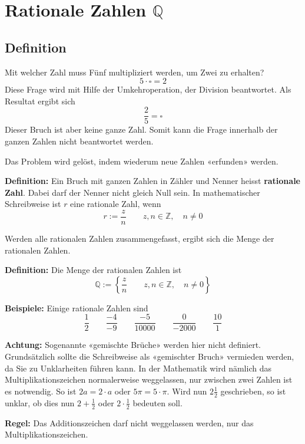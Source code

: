 \newpage
\section{Rationale Zahlen $\mathbb{Q}$}

\subsection{Definition}

Mit welcher Zahl muss Fünf multipliziert werden, um Zwei zu erhalten?
\[
  5\cdot\square = 2
\]
Diese Frage wird mit Hilfe der Umkehroperation, der Division beantwortet. Als Resultat ergibt sich
\[
  \frac{2}{5} = \square
\]
Dieser Bruch ist aber keine ganze Zahl. Somit kann die Frage innerhalb der ganzen Zahlen nicht beantwortet werden.

Das Problem wird gelöst, indem wiederum neue Zahlen «erfunden» werden.

\textbf{Definition:} Ein Bruch mit ganzen Zahlen in Zähler und Nenner heisst \textbf{rationale Zahl}. Dabei darf der Nenner nicht gleich Null sein. In mathematischer Schreibweise ist $r$ eine rationale Zahl, wenn
  \[
    r := \frac{z}{n} \qquad z,n \in \mathbb{Z},\quad n \ne 0
  \]

Werden alle rationalen Zahlen zusammengefasst, ergibt sich die Menge der rationalen Zahlen.

\textbf{Definition:} Die Menge der rationalen Zahlen ist
  \[
    \mathbb{Q} := \left\{ \frac{z}{n} \qquad z,n \in \mathbb{Z}, \quad n \ne 0\right\}
  \]
\begin{example}
  \textbf{Beispiele:} Einige rationale Zahlen sind
  \[
    \frac{1}{2} \qquad \frac{-4}{-9} \qquad \frac{-5}{10000} \qquad \frac{0}{-2000} \qquad \frac{10}{1}
  \]
\end{example}
\begin{note}
  \textbf{Achtung:} Sogenannte «gemischte Brüche» werden hier nicht definiert. Grundsätzlich sollte die Schreibweise als «gemischter Bruch» vermieden werden, da Sie zu Unklarheiten führen kann. In der Mathematik wird nämlich das Multiplikationszeichen normalerweise weggelassen, nur zwischen zwei Zahlen ist es notwendig. So ist $2a = 2\cdot a$ oder $5\pi = 5\cdot\pi$. Wird nun $2\frac{1}{2}$ geschrieben, so ist unklar, ob dies nun $2+\frac{1}{2}$ oder $2\cdot\frac{1}{2}$ bedeuten soll.

  \textbf{Regel:} Das Additionszeichen darf nicht weggelassen werden, nur das Multiplikationszeichen.
\end{note}

